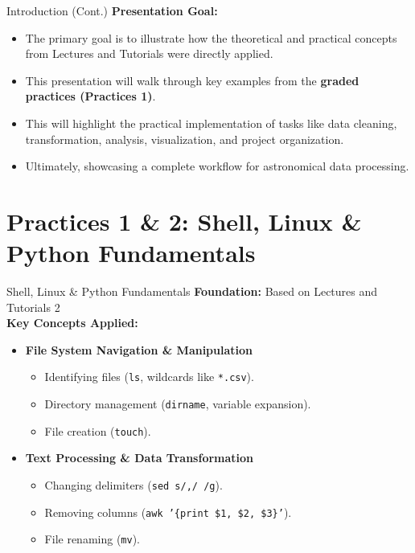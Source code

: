\documentclass[12pt, aspectratio=169]{beamer}
\renewcommand{\small}{\fontsize{11}{13}\selectfont}
\renewcommand{\large}{\fontsize{14}{17}\selectfont}
\newcommand{\rcode}[1]{{\small\texttt{#1}}}
\begin{document}
  \begin{frame}[t]{Introduction (Cont.)}
    \textbf{Presentation Goal:} \vspace{2.5mm}
    \begin{itemize} \large
      \item The primary goal is to illustrate how the theoretical and practical concepts from Lectures and Tutorials were directly applied. \vspace{1mm}
      \item This presentation will walk through key examples from the \textbf{graded practices (Practices 1)}. \vspace{1mm}
      \item This will highlight the practical implementation of tasks like data cleaning, transformation, analysis, visualization, and project organization. \vspace{1mm}
      \item Ultimately, showcasing a complete workflow for astronomical data processing.
    \end{itemize}
  \end{frame}

  \section{Practices 1 \& 2: Shell, Linux \& Python Fundamentals}
  \begin{frame}[t]{Shell, Linux \& Python Fundamentals}
    \textbf{Foundation:} Based on Lectures and Tutorials 2
    \\\vspace{2.5mm}
    \textbf{Key Concepts Applied:} \\\vspace{2.5mm}
    \begin{itemize}
      \item \textbf{File System Navigation \& Manipulation} \vspace{1mm}
      \begin{itemize}
        \item Identifying files (\rcode{ls}, wildcards like \rcode{*.csv}).
        \item Directory management (\rcode{dirname}, variable expansion).
        \item File creation (\rcode{touch}).
      \end{itemize} \vspace{1mm}
      \item \textbf{Text Processing \& Data Transformation} \vspace{1mm}
      \begin{itemize}
        \item Changing delimiters (\rcode{sed s/,/\ /g}).
        \item Removing columns (\rcode{awk '\{print \$1, \$2, \$3\}'}).
        \item File renaming (\rcode{mv}).
      \end{itemize}
    \end{itemize}
  \end{frame}
\end{document}
